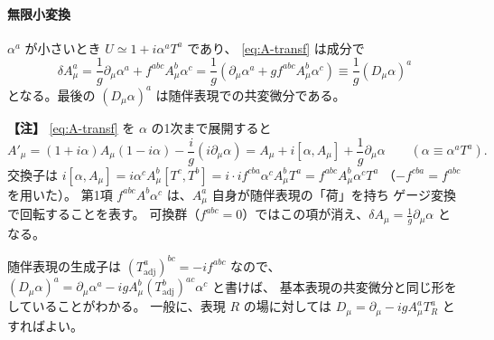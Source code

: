 \documentclass[uplatex,dvipdfmx,a4paper,11pt,openany]{jsbook}
\newenvironment{note}{\vspace{1ex}\par\footnotesize\noindent\textbf{【注】}}{\par\vspace{1ex}}
\numberwithin{equation}{chapter}
\theoremstyle{definition}
\theoremstyle{plain}
\theoremstyle{remark}
\begin{document}
\paragraph{無限小変換}
$\alpha^a$ が小さいとき $U\simeq1+i\alpha^aT^a$ であり、
\eqref{eq:A-transf} は成分で
\begin{equation}
\delta A_\mu^a
=\frac1g\partial_\mu\alpha^a+f^{abc}A_\mu^b\alpha^c
=\frac1g\left(\partial_\mu\alpha^a+gf^{abc}A_\mu^b\alpha^c\right)
\equiv\frac1g(D_\mu\alpha)^a
\label{eq:A-infinitesimal}
\end{equation}
となる。最後の $(D_\mu\alpha)^a$ は随伴表現での共変微分である。
\begin{note}
\eqref{eq:A-transf} を $\alpha$ の1次まで展開すると
\[
A'_\mu=(1+i\alpha)A_\mu(1-i\alpha)-\frac ig(i\partial_\mu\alpha)
=A_\mu+i[\alpha,A_\mu]+\frac1g\partial_\mu\alpha
\qquad(\alpha\equiv\alpha^aT^a).
\]
交換子は $i[\alpha,A_\mu]=i\alpha^cA_\mu^b[T^c,T^b]=i\cdot if^{cba}\alpha^cA_\mu^bT^a=f^{abc}A_\mu^b\alpha^cT^a$
（$-f^{cba}=f^{abc}$ を用いた）。
第1項 $f^{abc}A^b\alpha^c$ は、$A_\mu^a$ 自身が随伴表現の「荷」を持ち
ゲージ変換で回転することを表す。
可換群（$f^{abc}=0$）ではこの項が消え、$\delta A_\mu=\frac1g\partial_\mu\alpha$ となる。
\end{note}
随伴表現の生成子は $(T^a_{\mathrm{adj}})^{bc}=-if^{abc}$ なので、
$(D_\mu\alpha)^a=\partial_\mu\alpha^a-igA^b_\mu(T^b_{\mathrm{adj}})^{ac}\alpha^c$ と書けば、
基本表現の共変微分と同じ形をしていることがわかる。
一般に、表現 $R$ の場に対しては $D_\mu=\partial_\mu-igA_\mu^aT^a_R$ とすればよい。
\end{document}
